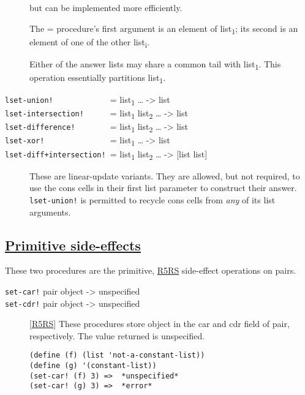 \begin{description}
but can be implemented more efficiently.

The = procedure's first argument is an element of list\textsubscript{1};
its second is an element of one of the other list\textsubscript{i}.

Either of the answer lists may share a common tail with
list\textsubscript{1}. This operation essentially partitions
list\textsubscript{1}.
\item[ \href{}{} \texttt{lset-union!~~~~~~~~~~~~~}=
list\textsubscript{1} \ldots{} -\textgreater{} list\\
\href{}{} \texttt{lset-intersection!~~~~~~}= list\textsubscript{1}
list\textsubscript{2} \ldots{} -\textgreater{} list\\
\href{}{} \texttt{lset-difference!~~~~~~~~}= list\textsubscript{1}
list\textsubscript{2} \ldots{} -\textgreater{} list\\
\href{}{} \texttt{lset-xor!~~~~~~~~~~~~~~~}= list\textsubscript{1}
\ldots{} -\textgreater{} list\\
\href{}{} \texttt{lset-diff+intersection!~}= list\textsubscript{1}
list\textsubscript{2} \ldots{} -\textgreater{} {[}list list{]} ]
These are linear-update variants. They are allowed, but not required, to
use the cons cells in their first list parameter to construct their
answer. \texttt{lset-union!} is permitted to recycle cons cells from
\emph{any} of its list arguments.
\end{description}

\subsection{\texorpdfstring{\href{}{Primitive
side-effects}}{Primitive side-effects}}\label{primitive-side-effects}

These two procedures are the primitive, \protect\hyperlink{R5RS}{R5RS}
side-effect operations on pairs.

\begin{description}
\item[ \href{}{} \texttt{set-car!} pair object -\textgreater{}
unspecified\\
\href{}{} \texttt{set-cdr!} pair object -\textgreater{} unspecified ]
{[}\protect\hyperlink{R5RS}{R5RS}{]} These procedures store object in
the car and cdr field of pair, respectively. The value returned is
unspecified.

\begin{verbatim}
(define (f) (list 'not-a-constant-list))
(define (g) '(constant-list))
(set-car! (f) 3) =>  *unspecified*
(set-car! (g) 3) =>  *error*
\end{verbatim}
\end{description}

